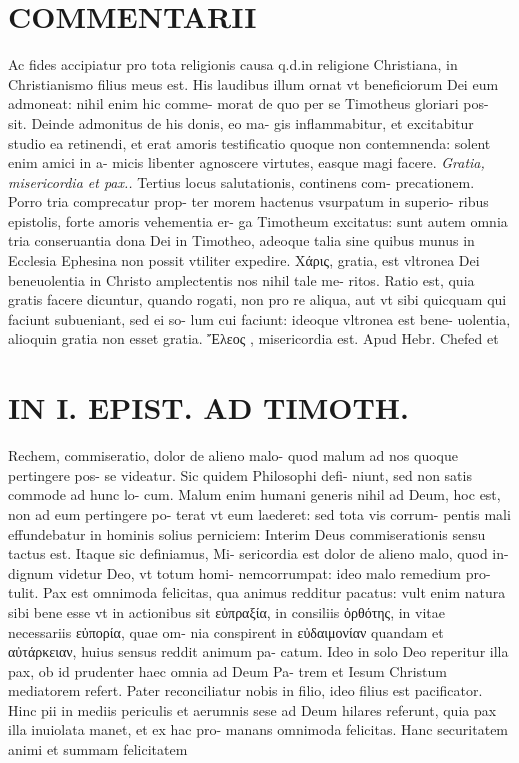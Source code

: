 \documentclass{article}
\begin{document}
\begin{pages}
\section*{COMMENTARII }\pstart Ac fides accipiatur pro tota religionis causa q.d.in religione Christiana, in Christianismo filius meus est.  \pend\pstart His laudibus illum ornat vt beneficiorum Dei eum admoneat: nihil enim hic comme- morat de quo per se Timotheus gloriari pos- sit. Deinde admonitus de his donis, eo ma- gis inflammabitur, et excitabitur studio ea retinendi, et erat amoris testificatio quoque non contemnenda: solent enim amici in a- micis libenter agnoscere virtutes, easque magi facere.  \pend
\textit{Gratia, misericordia et pax.. }\pstart Tertius locus salutationis, continens com- precationem. Porro tria comprecatur prop- ter morem hactenus vsurpatum in superio- ribus epistolis, forte amoris vehementia er- ga Timotheum excitatus: sunt autem omnia tria conseruantia dona Dei in Timotheo, adeoque talia sine quibus munus in Ecclesia Ephesina non possit vtiliter expedire.  \pend\pstart Xάρις, gratia, est vltronea Dei beneuolentia in Christo amplectentis nos nihil tale me- ritos. Ratio est, quia gratis facere dicuntur, quando rogati, non pro re aliqua, aut vt sibi quicquam qui faciunt subueniant, sed ei so- lum cui faciunt: ideoque vltronea est bene- uolentia, alioquin gratia non esset gratia. Ἔλεος , misericordia est. Apud Hebr. Chefed et  \pend
\section*{IN I. EPIST. AD TIMOTH. }
\marginpar{[ p.15 ]}\pstart Rechem, commiseratio, dolor de alieno malo- quod malum ad nos quoque pertingere pos- se videatur. Sic quidem Philosophi defi- niunt, sed non satis commode ad hunc lo- cum. Malum enim humani generis nihil ad Deum, hoc est, non ad eum pertingere po- terat vt eum laederet: sed tota vis corrum- pentis mali effundebatur in hominis solius perniciem: Interim Deus commiserationis sensu tactus est. Itaque sic definiamus, Mi- sericordia est dolor de alieno malo, quod in- dignum videtur Deo, vt totum homi- nemcorrumpat: ideo malo remedium pro- tulit.  \pend\pstart Pax est omnimoda felicitas, qua animus redditur pacatus: vult enim natura sibi bene esse vt in actionibus sit εὐπραξία, in consiliis ὀρθότης, in vitae necessariis εὐπορία, quae om- nia conspirent in εὐδαιμονίαν quandam et αὐτάρκειαν, huius sensus reddit animum pa- catum. Ideo in solo Deo reperitur illa pax, ob id prudenter haec omnia ad Deum Pa- trem et Iesum Christum mediatorem refert. Pater reconciliatur nobis in filio, ideo filius est pacificator. Hinc pii in mediis periculis et aerumnis sese ad Deum hilares referunt, quia pax illa inuiolata manet, et ex hac pro- manans omnimoda felicitas.  \pend\pstart Hanc securitatem animi et summam felicitatem  \pend
\marginpar{[ p.16 ]}

\end{pages}
\end{document}
